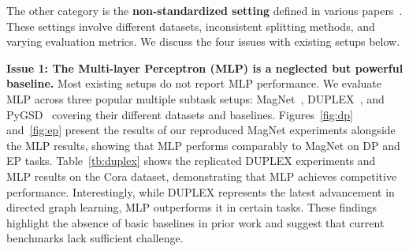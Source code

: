 The other category is the \textbf{non-standardized setting} defined in various papers~\cite{strap,odin,dhypr,digae,coba}. These settings involve different datasets, inconsistent splitting methods, and varying evaluation metrics. We discuss the four issues with existing setups below. 


\textbf{Issue 1: The Multi-layer Perceptron (MLP) is a neglected but powerful baseline.} 
Most existing setups do not report MLP performance. We evaluate MLP across three popular multiple subtask setups: MagNet~\cite{magnet}, DUPLEX~\cite{duplex}, and PyGSD~\cite{dpyg} covering their different datasets and baselines. Figures~\ref{fig:dp} and~\ref{fig:ep} present the results of our reproduced MagNet experiments alongside the MLP results, showing that MLP performs comparably to MagNet on DP and EP tasks. Table~\ref{tb:duplex} shows the replicated DUPLEX experiments and MLP results on the Cora dataset, demonstrating that MLP achieves competitive performance. Interestingly, while DUPLEX represents the latest advancement in directed graph learning, MLP outperforms it in certain tasks. %
These findings highlight the absence of basic baselines in prior work and suggest that current benchmarks lack sufficient challenge.


